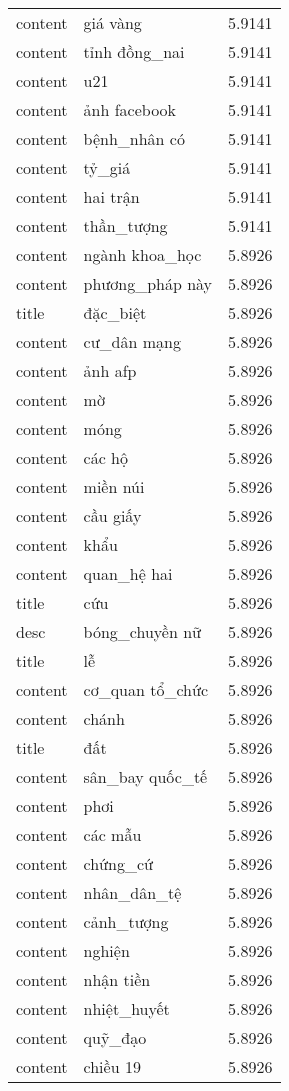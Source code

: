 \documentclass{article}
\begin{document}
\begin{tabular}{lll}
content & giá vàng & 5.9141\\
content & tỉnh đồng\_nai & 5.9141\\
content & u21 & 5.9141\\
content & ảnh facebook & 5.9141\\
content & bệnh\_nhân có & 5.9141\\
content & tỷ\_giá & 5.9141\\
content & hai trận & 5.9141\\
content & thần\_tượng & 5.9141\\
content & ngành khoa\_học & 5.8926\\
content & phương\_pháp này & 5.8926\\
title & đặc\_biệt & 5.8926\\
content & cư\_dân mạng & 5.8926\\
content & ảnh afp & 5.8926\\
content & mờ & 5.8926\\
content & móng & 5.8926\\
content & các hộ & 5.8926\\
content & miền núi & 5.8926\\
content & cầu giấy & 5.8926\\
content & khẩu & 5.8926\\
content & quan\_hệ hai & 5.8926\\
title & cứu & 5.8926\\
desc & bóng\_chuyền nữ & 5.8926\\
title & lễ & 5.8926\\
content & cơ\_quan tổ\_chức & 5.8926\\
content & chánh & 5.8926\\
title & đất & 5.8926\\
content & sân\_bay quốc\_tế & 5.8926\\
content & phơi & 5.8926\\
content & các mẫu & 5.8926\\
content & chứng\_cứ & 5.8926\\
content & nhân\_dân\_tệ & 5.8926\\
content & cảnh\_tượng & 5.8926\\
content & nghiện & 5.8926\\
content & nhận tiền & 5.8926\\
content & nhiệt\_huyết & 5.8926\\
content & quỹ\_đạo & 5.8926\\
content & chiều 19 & 5.8926\\

\end{tabular}
\end{document}

